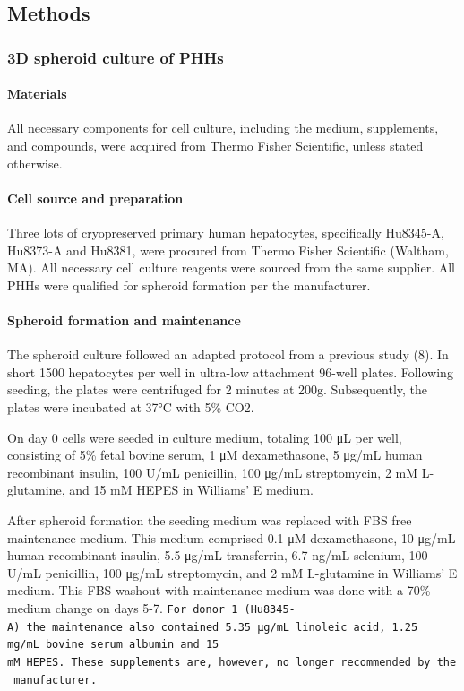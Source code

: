 \documentclass[
  letterpaper,
  DIV=11,
  numbers=noendperiod,
  oneside]{scrartcl}
\let\oldparagraph\paragraph
\renewcommand{\paragraph}[1]{\oldparagraph{#1}\mbox{}}
\begin{document}
\subsection{Methods}\label{methods}

\subsubsection{3D spheroid culture of
PHHs}\label{d-spheroid-culture-of-phhs}

\paragraph{Materials}\label{materials}

All necessary components for cell culture, including the medium,
supplements, and compounds, were acquired from Thermo Fisher Scientific,
unless stated otherwise.

\paragraph{Cell source and
preparation}\label{cell-source-and-preparation}

Three lots of cryopreserved primary human hepatocytes, specifically
Hu8345-A, Hu8373-A and Hu8381, were procured from Thermo Fisher
Scientific (Waltham, MA). All necessary cell culture reagents were
sourced from the same supplier. All PHHs were qualified for spheroid
formation per the manufacturer.

\paragraph{Spheroid formation and
maintenance}\label{spheroid-formation-and-maintenance}

The spheroid culture followed an adapted protocol from a previous study
(8). In short 1500 hepatocytes per well in ultra-low attachment 96-well
plates. Following seeding, the plates were centrifuged for 2 minutes at
200g. Subsequently, the plates were incubated at 37°C with 5\% CO2.

On day 0 cells were seeded in culture medium, totaling 100 μL per well,
consisting of 5\% fetal bovine serum, 1 μM dexamethasone, 5 μg/mL human
recombinant insulin, 100 U/mL penicillin, 100 μg/mL streptomycin, 2 mM
L-glutamine, and 15 mM HEPES in Williams' E medium.

After spheroid formation the seeding medium was replaced with FBS free
maintenance medium. This medium comprised 0.1 μM dexamethasone, 10 μg/mL
human recombinant insulin, 5.5 μg/mL transferrin, 6.7 ng/mL selenium,
100 U/mL penicillin, 100 μg/mL streptomycin, and 2 mM L-glutamine in
Williams' E medium. This FBS washout with maintenance medium was done
with a 70\% medium change on days 5-7.
\texttt{For\ donor\ 1\ (Hu8345-A)\ the\ maintenance\ also\ contained\ 5.35 μg/mL\ linoleic\ acid,\ 1.25 mg/mL\ bovine\ serum\ albumin\ and\ 15 mM\ HEPES.\ These\ supplements\ are,\ however,\ no\ longer\ recommended\ by\ the\ manufacturer}\texttt{.}
\end{document}
